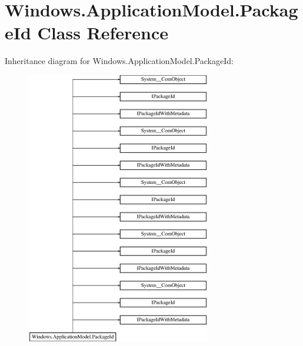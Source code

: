 \hypertarget{class_windows_1_1_application_model_1_1_package_id}{}\section{Windows.\+Application\+Model.\+Package\+Id Class Reference}
\label{class_windows_1_1_application_model_1_1_package_id}
Inheritance diagram for Windows.\+Application\+Model.\+Package\+Id\+:\begin{figure}[H]
\begin{center}
\leavevmode
\includegraphics[height=12.000000cm]{class_windows_1_1_application_model_1_1_package_id}
\end{center}
\end{figure}
